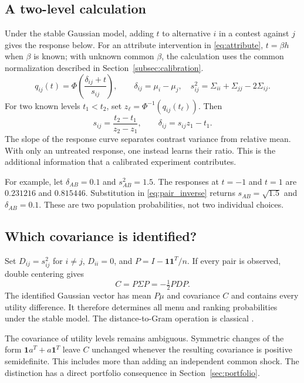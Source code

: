 \documentclass[11pt]{amsart}
\newcommand{\one}{\mathbf 1}
\theoremstyle{definition}
\begin{document}
\subsection{A two-level calculation}
Under the stable Gaussian model, adding $t$ to alternative $i$ in a contest against $j$ gives the response below. For an attribute intervention in \eqref{eq:attribute}, $t=\beta h$ when $\beta$ is known; with unknown common $\beta$, the calculation uses the common normalization described in Section~\ref{subsec:calibration}.
\begin{equation}\label{eq:response}
 q_{ij}(t)=\Phi\left(\frac{\delta_{ij}+t}{s_{ij}}\right),\qquad
 \delta_{ij}=\mu_i-\mu_j,\quad
 s_{ij}^2=\Sigma_{ii}+\Sigma_{jj}-2\Sigma_{ij}.
\end{equation}
For two known levels $t_1<t_2$, set $z_\ell=\Phi^{-1}(q_{ij}(t_\ell))$. Then
\begin{equation}\label{eq:pair_inverse}
 s_{ij}=\frac{t_2-t_1}{z_2-z_1},\qquad
 \delta_{ij}=s_{ij}z_1-t_1.
\end{equation}
The slope of the response curve separates contrast variance from relative mean. With only an untreated response, one instead learns their ratio. This is the additional information that a calibrated experiment contributes.

For example, let $\delta_{AB}=0.1$ and $s_{AB}^2=1.5$. The responses at $t=-1$ and $t=1$ are $0.231216$ and $0.815446$. Substitution in \eqref{eq:pair_inverse} returns $s_{AB}=\sqrt{1.5}$ and $\delta_{AB}=0.1$. These are two population probabilities, not two individual choices.

\subsection{Which covariance is identified?}
Set $D_{ij}=s_{ij}^2$ for $i\ne j$, $D_{ii}=0$, and
$P=I-\one\one^T/n$. If every pair is observed, double centering gives
\begin{equation}\label{eq:centered}
 C=P\Sigma P=-\tfrac12 PDP.
\end{equation}
The identified Gaussian vector has mean $P\mu$ and covariance $C$ and contains every utility difference. It therefore determines all menu and ranking probabilities under the stable model. The distance-to-Gram operation is classical \cite{gower1966}.

The covariance of utility levels remains ambiguous. Symmetric changes of the form
$\one a^T+a\one^T$ leave $C$ unchanged whenever the resulting covariance is positive semidefinite. This includes more than adding an independent common shock. The distinction has a direct portfolio consequence in Section~\ref{sec:portfolio}.
\end{document}
